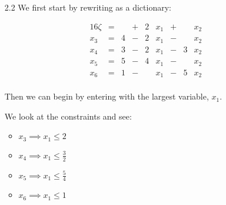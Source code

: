 \documentclass[12pt,letterpaper]{article}
\newcommand*\continueopt[1]{
  Now, we can continue optimizing since #1 has a positive coefficient.
}
\newcommand*\enterleave[2]{
  So we can let #1 enter and #2 leave.
}
\newcommand*\morerestrictive[2]{
  The more restrictive constraint is that #1 $\leq$ #2, so set #1 $=$ #2.
}
\newcommand*\newdict{
  So we have a new dictionary:
}
\newcommand*\newvalue[2]{
  This gives a new value for #1. #1 $ = $ #2
}
\newcommand*\opt{
  Since we have no more optimizable variables
  (all variable coefficients of $\zeta$ are non-positive),
  we can no longer maximize $\zeta$.
}
\newcommand*\optsolution[2]{
  Then we have an optimal solution with #1, and value #2.
}
\begin{document}
\begin{enumerate}
      \continueopt{$x_3$}

      We look at the constraints and see:
      \begin{itemize}
        \item $x_1 \implies x_3 \leq 6$
        \item $x_2 \implies x_3 \leq 1$
      \end{itemize}

      \morerestrictive{$x_3$}{$1$}

      \enterleave{$x_3$}{$x_2$}

      \[
        x_3 = 1 - x_4 - 5x_2 - 2x_6 + x_5
      \]

      \newvalue{$x_1$}{$2 - x_4 + 2x_2 + x_6 - x_5$}

      \newvalue{$\zeta$}{$17 - 2x_4 - 5x_2 - 4x_6 - x_5$}

      \newdict

      \begin{alignat*}{16}
        \zeta & {}={} & 17 & {}-{} & 2 & x_4 & {}-{} & 5 & x_2 & {}-{} & 4 & x_6 & {}-{} &  & x_5 \\
        x_1   & {}={} & 2  & {}-{} &   & x_4 & {}+{} & 2 & x_2 & {}+{} &   & x_6 & {}-{} &  & x_5 \\
        x_3   & {}={} & 1  & {}-{} &   & x_4 & {}-{} & 5 & x_2 & {}-{} & 2 & x_6 & {}+{} &  & x_5 \\
      \end{alignat*}

      \opt

      \optsolution{$x_1 = 2, x_2 = 0, x_3 = 1, x_4 = 0$}{17}
    \item [2.2]
      We first start by rewriting as a dictionary:

      \begin{alignat*}{16}
        \zeta & {}={} &   & {}+{} & 2 & x_1 & {}+{} &   & x_2 \\
        x_3   & {}={} & 4 & {}-{} & 2 & x_1 & {}-{} &   & x_2 \\
        x_4   & {}={} & 3 & {}-{} & 2 & x_1 & {}-{} & 3 & x_2 \\
        x_5   & {}={} & 5 & {}-{} & 4 & x_1 & {}-{} &   & x_2 \\
        x_6   & {}={} & 1 & {}-{} &   & x_1 & {}-{} & 5 & x_2 \\
      \end{alignat*}

      Then we can begin by entering with the largest variable, $x_1$.

      We look at the constraints and see:
      \begin{itemize}
        \item $x_3 \implies x_1 \leq 2$
        \item $x_4 \implies x_1 \leq \frac{3}{2}$
        \item $x_5 \implies x_1 \leq \frac{5}{4}$
        \item $x_6 \implies x_1 \leq 1$
      \end{itemize}


\end{enumerate}
\end{document}
